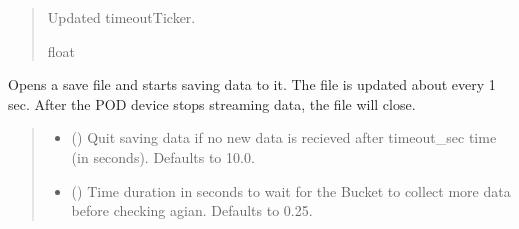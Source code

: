 \documentclass[letterpaper,10pt,english]{sphinxmanual}
\begin{document}
\begin{fulllineitems}
\begin{fulllineitems}
\begin{quote}
\begin{description}
\sphinxAtStartPar
Updated timeoutTicker.

\sphinxAtStartPar
float

\end{description}\end{quote}

\end{fulllineitems}


\begin{fulllineitems}
\label{\detokenize{PodApi.Stream.Collect:PodApi.Stream.Collect.DrainBucketToFile.DrainBucket._ThreadedDrainBucketToFile}}
\pysigstartsignatures
{}
\pysigstopsignatures
\sphinxAtStartPar
Opens a save file and starts saving data to it. The file is updated about every 1 sec.         After the POD device stops streaming data, the file will close.
\begin{quote}\begin{description}
\begin{itemize}
\item {} 
\sphinxAtStartPar
{} (\sphinxstyleliteralemphasis{\sphinxupquote{, }}) \textendash{} Quit saving data if no new data is recieved                 after timeout\_sec time (in seconds). Defaults to 10.0.

\item {} 
\sphinxAtStartPar
{} (\sphinxstyleliteralemphasis{\sphinxupquote{, }}) \textendash{} Time duration in seconds to wait for the Bucket to                 collect more data before checking agian. Defaults to 0.25.

\end{itemize}

\end{description}\end{quote}

\end{fulllineitems}


\end{fulllineitems}
\end{document}
